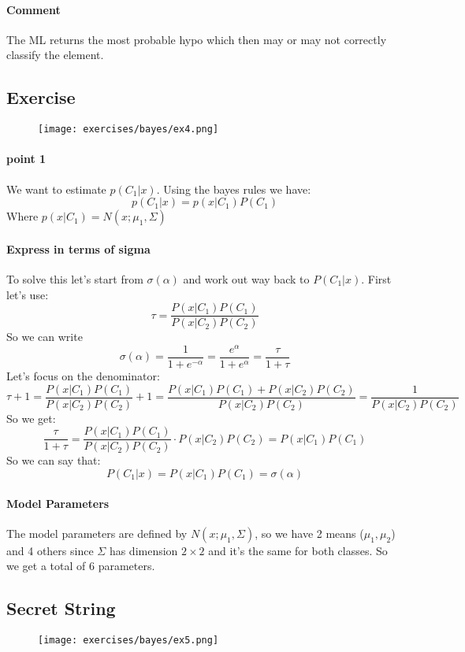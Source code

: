 \paragraph{Comment}
The ML returns the most probable hypo which then may or may not correctly classify the element.

\subsection{Exercise}
\begin{figure}[H]
    \centering
    \texttt{[image: exercises/bayes/ex4.png]}
\end{figure}

\paragraph{point 1}
We want to estimate $p(C_1|x)$. Using the bayes rules we have:
$$p(C_1|x)=p(x|C_1)P(C_1)$$
Where $p(x|C_1)=N(x;\mu_1, \Sigma)$

\paragraph{Express in terms of sigma}
To solve this let's start from $\sigma(\alpha)$ and work out way back to $P(C_1|x)$. First let's use:
$$\tau=\frac{P(x|C_1)P(C_1)}{P(x|C_2)P(C_2)}$$
So we can write
$$\sigma(\alpha)=\frac{1}{1+e^{-\alpha}}=\frac{e^{\alpha}}{1+e^{\alpha}}=\frac{\tau}{1+\tau}$$
Let's focus on the denominator:
$$\tau+1=\frac{P(x|C_1)P(C_1)}{P(x|C_2)P(C_2)}+1=\frac{P(x|C_1)P(C_1)+P(x|C_2)P(C_2)}{P(x|C_2)P(C_2)}=\frac{1}{P(x|C_2)P(C_2)}$$
So we get:
$$\frac{\tau}{1+\tau}=\frac{P(x|C_1)P(C_1)}{P(x|C_2)P(C_2)}\cdot P(x|C_2)P(C_2)=P(x|C_1)P(C_1)$$
So we can say that:
$$P(C_1|x)=P(x|C_1)P(C_1)=\sigma(\alpha)$$

\paragraph{Model Parameters}
The model parameters are defined by $N(x;\mu_1, \Sigma)$, so we have 2 means ($\mu_1,\mu_2$) and 4 others since $\Sigma$ has dimension $2 \times 2$ and it's the same for both classes. So we get a total of 6 parameters.

\subsection{Secret String}
\begin{figure}[H]
    \centering
    \texttt{[image: exercises/bayes/ex5.png]}
\end{figure}

